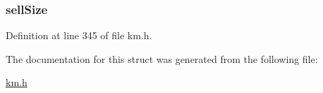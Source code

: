 \subsubsection[{\texorpdfstring{sell\+Size}{sellSize}}]{ sell\+Size}\hypertarget{struct_k_1_1m_safety_a4f82c0df812be2c3dc86ab0778b171d7}{}\label{struct_k_1_1m_safety_a4f82c0df812be2c3dc86ab0778b171d7}


Definition at line 345 of file km.\+h.



The documentation for this struct was generated from the following file\+:\begin{DoxyCompactItemize}
\item 
\hyperlink{km_8h}{km.\+h}\end{DoxyCompactItemize}

